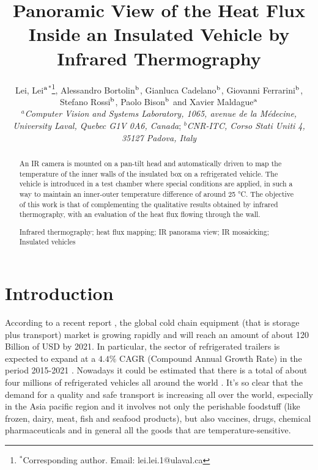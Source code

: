 \documentclass{tQRT2e}
\begin{document}


\title{Panoramic View of the Heat Flux Inside an Insulated Vehicle by Infrared Thermography}

\author{Lei, Lei$^{\rm a}$$^{\ast}$\thanks{$^\ast$Corresponding author. Email: lei.lei.1@ulaval.ca
		\vspace{6pt}},  Alessandro Bortolin$^{\rm b}$, Gianluca Cadelano$^{\rm b}$, Giovanni Ferrarini$^{\rm b}$, Stefano Rossi$^{\rm b}$, Paolo Bison$^{\rm b}$ and Xavier Maldague$^{\rm a}$ \\\vspace{6pt}  $^{a}${\em{Computer Vision and Systems Laboratory, 1065, avenue de la Médecine, University Laval, Quebec G1V 0A6, Canada}};
	$^{b}${\em{CNR-ITC, Corso Stati Uniti 4, 35127 Padova, Italy}} \\\received{} }

\maketitle

\begin{abstract}
	An IR camera is mounted on a pan-tilt head and automatically driven to map the temperature of the inner walls of the insulated box on a refrigerated vehicle. The vehicle is introduced in a test chamber where special conditions are applied, in such a way to maintain an inner-outer temperature difference of around 25 °C. The objective of this work is that of complementing the qualitative results obtained by infrared thermography, with an evaluation of the heat flux flowing through the wall.
	
\begin{keywords} Infrared thermography; heat flux mapping; IR panorama view; IR mosaicking; Insulated vehicles 
\end{keywords}
\end{abstract}

%
%
\section{Introduction}
According to a recent report \cite{Zion2016}, the global cold chain equipment (that is storage plus transport) market is growing rapidly and will reach an amount of about 120 Billion of USD by 2021. In particular, the sector of refrigerated trailers is expected to expand at a $ 4.4\% $ CAGR (Compound Annual Growth Rate) in the period 2015-2021 \cite{RM2015}. Nowadays it could be estimated that there is a total of about four millions of refrigerated vehicles all around the world \cite{UNEP2010}. It’s so clear that the demand for a quality and safe transport is increasing all over the world, especially in the Asia pacific region and it involves not only the perishable foodstuff (like frozen, dairy, meat, fish and seafood products), but also vaccines, drugs, chemical pharmaceuticals and in general all the goods that are temperature-sensitive. 
\end{document}
